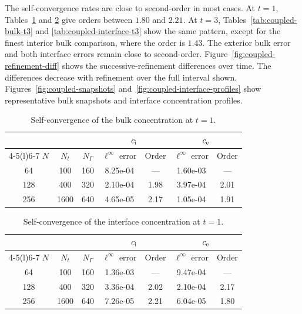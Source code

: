 \documentclass[11pt,reqno]{amsart}
\theoremstyle{plain}
\theoremstyle{definition}
\numberwithin{equation}{section}
\begin{document}
The self-convergence rates are close to second-order in most cases. At
$t=1$, Tables~\ref{tab:coupled-bulk-t1} and
\ref{tab:coupled-interface-t1} give orders between $1.80$ and $2.21$. At
$t=3$, Tables~\ref{tab:coupled-bulk-t3} and
\ref{tab:coupled-interface-t3} show the same pattern, except for the finest
interior bulk comparison, where the order is $1.43$. The exterior bulk error
and both interface errors remain close to second-order.
Figure~\ref{fig:coupled-refinement-diff} shows the
successive-refinement differences over time. The differences decrease with
refinement over the full interval shown. Figures~\ref{fig:coupled-snapshots}
and~\ref{fig:coupled-interface-profiles} show representative bulk snapshots
and interface concentration profiles.



\begin{table}[htbp]
\centering
\caption{Self-convergence of the bulk
concentration at $t=1$.}
\label{tab:coupled-bulk-t1}
\begin{tabular}{@{}c c c c c c c@{}}
\toprule
 & & & \multicolumn{2}{c}{$c_{\rm i}$} & \multicolumn{2}{c}{$c_{\rm e}$} \\
\cmidrule(lr){4-5}\cmidrule(l){6-7}
$N$ & $N_t$ & $N_\Gamma$ & $\ell^\infty$ error & Order & $\ell^\infty$ error & Order \\
\midrule
64  & 100  & 160 & 8.25e-04 & ---  & 1.60e-03 & ---  \\
128 & 400  & 320 & 2.10e-04 & 1.98 & 3.97e-04 & 2.01 \\
256 & 1600 & 640 & 4.65e-05 & 2.17 & 1.05e-04 & 1.91 \\
\bottomrule
\end{tabular}
\end{table}

\begin{table}[htbp]
\centering
\caption{Self-convergence of the interface
concentration at $t=1$.}
\label{tab:coupled-interface-t1}
\begin{tabular}{@{}c c c c c c c@{}}
\toprule
 & & & \multicolumn{2}{c}{$c_{\rm i}$} & \multicolumn{2}{c}{$c_{\rm e}$} \\
\cmidrule(lr){4-5}\cmidrule(l){6-7}
$N$ & $N_t$ & $N_\Gamma$ & $\ell^\infty$ error & Order & $\ell^\infty$ error & Order \\
\midrule
64  & 100  & 160 & 1.36e-03 & ---  & 9.47e-04 & ---  \\
128 & 400  & 320 & 3.36e-04 & 2.02 & 2.10e-04 & 2.17 \\
256 & 1600 & 640 & 7.26e-05 & 2.21 & 6.04e-05 & 1.80 \\
\bottomrule
\end{tabular}
\end{table}
\end{document}
